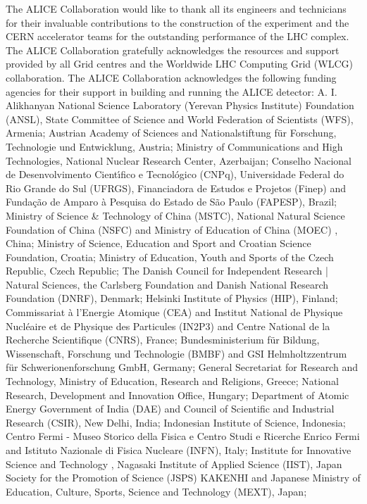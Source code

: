 
The ALICE Collaboration would like to thank all its engineers and technicians for their invaluable contributions to the construction of the experiment and the CERN accelerator teams for the outstanding performance of the LHC complex.
%
The ALICE Collaboration gratefully acknowledges the resources and support provided by all Grid centres and the Worldwide LHC Computing Grid (WLCG) collaboration.
%
The ALICE Collaboration acknowledges the following funding agencies for their support in building and running the ALICE detector:
%
A. I. Alikhanyan National Science Laboratory (Yerevan Physics Institute) Foundation (ANSL), State Committee of Science and World Federation of Scientists (WFS), Armenia;
%
Austrian Academy of Sciences and Nationalstiftung f\"{u}r Forschung, Technologie und Entwicklung, Austria;
%
Ministry of Communications and High Technologies, National Nuclear Research Center, Azerbaijan;
%
Conselho Nacional de Desenvolvimento Cient\'{\i}fico e Tecnol\'{o}gico (CNPq), Universidade Federal do Rio Grande do Sul (UFRGS), Financiadora de Estudos e Projetos (Finep) and Funda\c{c}\~{a}o de Amparo \`{a} Pesquisa do Estado de S\~{a}o Paulo (FAPESP), Brazil;
%
Ministry of Science \& Technology of China (MSTC), National Natural Science Foundation of China (NSFC) and Ministry of Education of China (MOEC) , China;
%
Ministry of Science, Education and Sport and Croatian Science Foundation, Croatia;
%
Ministry of Education, Youth and Sports of the Czech Republic, Czech Republic;
%
The Danish Council for Independent Research | Natural Sciences, the Carlsberg Foundation and Danish National Research Foundation (DNRF), Denmark;
%
Helsinki Institute of Physics (HIP), Finland;
%
Commissariat \`{a} l'Energie Atomique (CEA) and Institut National de Physique Nucl\'{e}aire et de Physique des Particules (IN2P3) and Centre National de la Recherche Scientifique (CNRS), France;
%
Bundesministerium f\"{u}r Bildung, Wissenschaft, Forschung und Technologie (BMBF) and GSI Helmholtzzentrum f\"{u}r Schwerionenforschung GmbH, Germany;
%
General Secretariat for Research and Technology, Ministry of Education, Research and Religions, Greece;
%
National Research, Development and Innovation Office, Hungary;
%
Department of Atomic Energy Government of India (DAE) and Council of Scientific and Industrial Research (CSIR), New Delhi, India;
%
Indonesian Institute of Science, Indonesia;
%
Centro Fermi - Museo Storico della Fisica e Centro Studi e Ricerche Enrico Fermi and Istituto Nazionale di Fisica Nucleare (INFN), Italy;
%
Institute for Innovative Science and Technology , Nagasaki Institute of Applied Science (IIST), Japan Society for the Promotion of Science (JSPS) KAKENHI and Japanese Ministry of Education, Culture, Sports, Science and Technology (MEXT), Japan;
